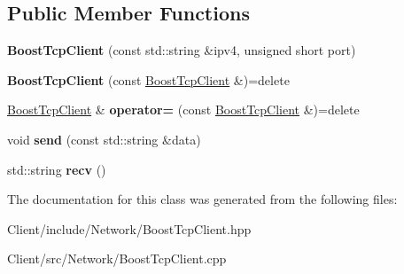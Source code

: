 \subsection*{Public Member Functions}
\begin{DoxyCompactItemize}
\item 
\mbox{\label{classbbl_1_1cli_1_1_boost_tcp_client_a7fc15f3bd8362810778c399d6287947c}} 
{\bfseries Boost\+Tcp\+Client} (const std\+::string \&ipv4, unsigned short port)
\item 
\mbox{\label{classbbl_1_1cli_1_1_boost_tcp_client_ab293037b6a6e4da6bbafc7db3b400333}} 
{\bfseries Boost\+Tcp\+Client} (const \hyperlink{classbbl_1_1cli_1_1_boost_tcp_client}{Boost\+Tcp\+Client} \&)=delete
\item 
\mbox{\label{classbbl_1_1cli_1_1_boost_tcp_client_a4492d638ef5c41c65ade72a408a03bbd}} 
\hyperlink{classbbl_1_1cli_1_1_boost_tcp_client}{Boost\+Tcp\+Client} \& {\bfseries operator=} (const \hyperlink{classbbl_1_1cli_1_1_boost_tcp_client}{Boost\+Tcp\+Client} \&)=delete
\item 
\mbox{\label{classbbl_1_1cli_1_1_boost_tcp_client_ac2dee8492cf958fa1f10c19ac9b68919}} 
void {\bfseries send} (const std\+::string \&data)
\item 
\mbox{\label{classbbl_1_1cli_1_1_boost_tcp_client_a238e3f918d949353a8145d42f46d231c}} 
std\+::string {\bfseries recv} ()
\end{DoxyCompactItemize}


The documentation for this class was generated from the following files\+:\begin{DoxyCompactItemize}
\item 
Client/include/\+Network/Boost\+Tcp\+Client.\+hpp\item 
Client/src/\+Network/Boost\+Tcp\+Client.\+cpp\end{DoxyCompactItemize}
